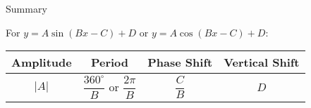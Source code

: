 \documentclass[t,usenames,dvipsnames]{beamer}
\begin{document}
\begin{frame}{Summary}

\begin{center}
For $y = A\sin\left(Bx-C\right) + D$ \quad or \quad $y=A\cos\left(Bx-C\right) + D$: \\[18pt]

\setlength{\extrarowheight}{11pt}
\begin{tabular}{|c|c|c|c|}
    \hline
    \textbf{Amplitude}  &   \textbf{Period} &   \textbf{Phase Shift}  &   \textbf{Vertical Shift} \\[6pt] \hline
    $|A|$ &   $\dfrac{360^\circ}{B}$ or $\dfrac{2\pi}{B}$ &   $\dfrac{C}{B}$  &   $D$ \\[11pt] \hline
\end{tabular}
\end{center}
\end{frame}
\end{document}
